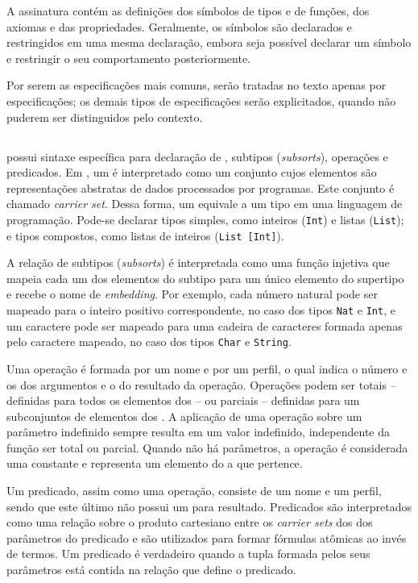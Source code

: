 A assinatura contém as definições dos símbolos de tipos e de funções, dos axiomas e das propriedades.
Geralmente, os símbolos são declarados e restringidos em uma mesma declaração, embora seja possível declarar um símbolo e restringir o seu comportamento posteriormente.

Por serem as especificações mais comuns, serão tratadas no texto apenas por especificações; os demais tipos de especificações serão explicitados, quando não puderem ser distinguidos pelo contexto.

\subsection{\CASL}
\CASL possui sintaxe específica para declaração de \sorts, subtipos (\textit{subsorts}), operações e predicados.
Em \CASL, um \sort é interpretado como um conjunto cujos elementos são representações abstratas de dados processados por programas.
Este conjunto é chamado \textit{carrier set}.
Dessa forma, um \sort equivale a um tipo em uma linguagem de programação.
Pode-se declarar tipos simples, como inteiros (\Verb.Int.) e listas (\Verb.List.); e tipos compostos, como listas de inteiros (\Verb.List [Int].).

A relação de subtipos (\textit{subsorts}) é interpretada como uma função injetiva que mapeia cada um dos elementos do subtipo para um único elemento do supertipo e recebe o nome de \textit{embedding}.
Por exemplo, cada número natural pode ser mapeado para o inteiro positivo correspondente, no caso dos tipos \Verb.Nat. e \Verb.Int., e um caractere pode ser mapeado para uma cadeira de caracteres formada apenas pelo caractere mapeado, no caso dos tipos \Verb.Char. e \Verb.String..

Uma operação é formada por um nome e por um perfil, o qual indica o número e os \sorts dos argumentos e o \sort do resultado da operação.
Operações podem ser totais -- definidas para todos os elementos dos \sorts{} -- ou parciais -- definidas para um subconjuntos de elementos dos \sorts.
A aplicação de uma operação sobre um parâmetro indefinido sempre resulta em um valor indefinido, independente da função ser total ou parcial.
Quando não há parâmetros, a operação é considerada uma constante e representa um elemento do \sort a que pertence.

Um predicado, assim como uma operação, consiste de um nome e um perfil, sendo que este último não possui um \sort para resultado.
Predicados são interpretados como uma relação sobre o produto cartesiano entre os \textit{carrier sets} dos \sorts dos parâmetros do predicado e são utilizados para formar fórmulas atômicas ao invés de termos.
Um predicado é verdadeiro quando a tupla formada pelos seus parâmetros está contida na relação que define o predicado.

